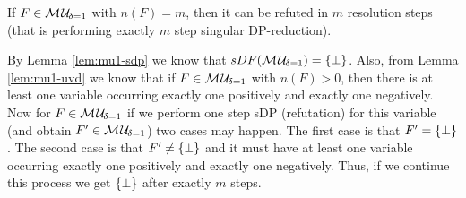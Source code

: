 \documentclass{report}
\begin{document}
\begin{lem}\label{lem:mu1-refu-tree}
If $F \in \mathcal{M\hspace{0.8pt}U}_{\!\delta=1}$ with $n(F)=m$, then it can be refuted in $m$ resolution steps (that is performing exactly $m$ step singular DP-reduction).
\end{lem}
\begin{prf}
By Lemma \ref{lem:mu1-sdp} we know that $sDF(\mathcal{M\hspace{0.8pt}U}_{\!\delta=1})=\{ \bot \}$. Also, from Lemma \ref{lem:mu1-uvd} we know that if $F \in \mathcal{M\hspace{0.8pt}U}_{\!\delta=1}$ with $n(F) > 0$, then there is at least one variable occurring exactly one positively and exactly one negatively. Now for $F \in \mathcal{M\hspace{0.8pt}U}_{\!\delta=1}$ if we perform one step sDP (refutation) for this variable (and obtain $F' \in \mathcal{M\hspace{0.8pt}U}_{\!\delta=1}$) two cases may happen. The first case is that $F' =\{ \bot \}$. The second case is that $F' \not = \{ \bot \}$ and it must have at least one variable occurring exactly one positively and exactly one negatively. Thus, if we continue this process we get $\{ \bot \}$ after exactly $m$ steps. 
\end{prf}
\end{document}
